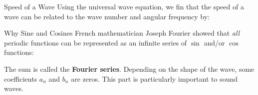 \documentclass[12pt,aspectratio=169]{beamer}
\newcommand{\eq}[2]{\vspace{#1}{\Large\begin{displaymath}#2\end{displaymath}}}
\begin{document}
\begin{frame}{Speed of a Wave}
  Using the universal wave equation, we fin that the speed of a wave can be
  related to the wave number and angular frequency by:

  \eq{-.2in}{
    v=\frac{\lambda}T=\frac{2\pi/k}{2\pi/\omega}=\frac{\omega}k
  }
\end{frame}



\begin{frame}{Why Sine and Cosines}
  French mathematician Joseph Fourier showed that \emph{all} periodic functions
  can be represented as an infinite series of $\sin$ and/or $\cos$ functions:


  The sum is called the \textbf{Fourier series}. Depending on the shape of the
  wave, some coefficients $a_n$ and $b_n$ are zeros. This part is particularly
  important to sound waves.
\end{frame}
\end{document}
